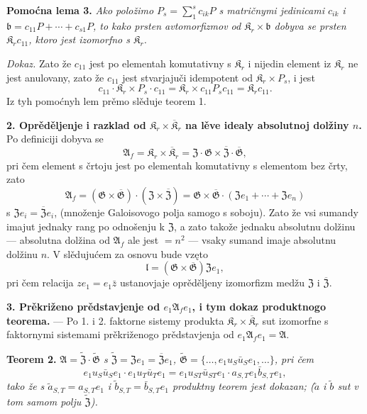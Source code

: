 \documentclass[11pt]{article}
\begin{document}
\noindent\textbf{Pomoćna lema 3.} \emph{Ako položimo \(P_s=\sum_1^s c_{ik}P\) s matričnymi jedinicami \(c_{ik}\) i \(\mathfrak b=c_{11}P+\cdots+c_{s1}P\), to kako prsten avtomorfizmov od \(\mathfrak K_r\times\mathfrak b\) dobyva se prsten \(\mathfrak K_rc_{11}\), ktoro jest izomorfno s \(\mathfrak K_r\).}

\noindent\emph{Dokaz.} Zato že \(c_{11}\) jest po elementah komutativny s \(\mathfrak K_r\) i nijedin element iz \(\mathfrak K_r\) ne jest anulovany, zato že \(c_{11}\) jest stvarjajuči idempotent od \(\mathfrak K_r\times P_s\), i jest
\[
c_{11}\cdot\mathfrak K_r\times P_s\cdot c_{11}
=\mathfrak K_r\times c_{11}P_sc_{11}
=\mathfrak K_rc_{11}.
\]
Iz tyh pomoćnyh lem prěmo slěduje teorem 1.

\noindent\textbf{2. Oprěděljenje i razklad od \(\mathfrak K_r\times\overline{\mathfrak K}_r\) na lěve idealy absolutnoj dolžiny \(n\).} Po definiciji dobyva se
\[
\mathfrak A_f=\mathfrak K_r\times\overline{\mathfrak K}_r
=\mathfrak Z\cdot\mathfrak G\times\overline{\mathfrak Z}\cdot\overline{\mathfrak G},
\]
pri čem element s črtoju jest po elementah komutativny s elementom bez črty, zato
\[
\mathfrak A_f
=(\mathfrak G\times\overline{\mathfrak G})\cdot(\mathfrak Z\times\overline{\mathfrak Z})
=\mathfrak G\times\overline{\mathfrak G}\cdot(\mathfrak Ze_1+\cdots+\mathfrak Ze_n)
\]
s \(\mathfrak Ze_i=\overline{\mathfrak Z}e_i\), (množenje Galoisovogo polja samogo s soboju). Zato že vsi sumandy imajut jednaky rang po odnošenju k \(\mathfrak Z\), a zato takože jednaku absolutnu dolžinu --- absolutna dolžina od \(\mathfrak A_f\) ale jest \(=n^2\) --- vsaky sumand imaje absolutnu dolžinu \(n\). V slědujućem za osnovu bude vzęto
\[
\mathfrak l=(\mathfrak G\times\overline{\mathfrak G})\mathfrak Ze_1,
\]
pri čem relacija \(ze_1=e_1\bar z\) ustanovjaje oprěděljeny izomorfizm medžu \(\mathfrak Z\) i \(\overline{\mathfrak Z}\).

\noindent\textbf{3. Prěkriženo prědstavjenje od \(e_1\mathfrak A_fe_1\), i tym dokaz produktnogo teorema.} --- Po 1. i 2. faktorne sistemy produkta \(\mathfrak K_r\times\overline{\mathfrak K}_r\) sut izomorfne s faktornymi sistemami prěkriženogo prědstavjenja od \(e_1\mathfrak A_fe_1=\mathfrak A\).

\noindent\textbf{Teorem 2.} \emph{\(\mathfrak A=\widetilde{\mathfrak Z}\cdot\widetilde{\mathfrak G}\) s \(\widetilde{\mathfrak Z}=\mathfrak Ze_1=\overline{\mathfrak Z}e_1\), \(\widetilde{\mathfrak G}=\{\ldots,e_1u_S\bar u_Se_1,\ldots\}\), pri čem
\[
e_1u_S\bar u_Se_1\cdot e_1u_T\bar u_Te_1
=e_1u_{ST}\bar u_{ST}e_1\cdot a_{S,T}e_1\bar b_{S,T}e_1,
\]
tako že s \(\tilde a_{S,T}=a_{S,T}e_1\) i \(\tilde b_{S,T}=\bar b_{S,T}e_1\) produktny teorem jest dokazan; (\(\tilde a\) i \(\tilde b\) sut v tom samom polju \(\widetilde{\mathfrak Z}\)).}
\end{document}
